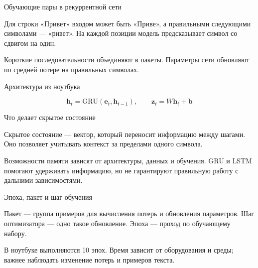 \documentclass[aspectratio=169,12pt]{beamer}
\begin{document}
\begin{frame}{Обучающие пары в рекуррентной сети}
\color{ink}
{\small Для строки «Привет» входом может быть «Приве», а правильными следующими символами — «ривет». На каждой позиции модель предсказывает символ со сдвигом на один.
\par\vspace{0.6em}Короткие последовательности объединяют в пакеты. Параметры сети обновляют по средней потере на правильных символах.}
\end{frame}

\begin{frame}{Архитектура из ноутбука}
\color{ink}
\begin{center}\end{center}\[\mathbf h_t=\mathrm{GRU}(\mathbf e_t,\mathbf h_{t-1}),\qquad\mathbf z_t=W\mathbf h_t+\mathbf b\]
\end{frame}

\begin{frame}{Что делает скрытое состояние}
\color{ink}
{\small Скрытое состояние — вектор, который переносит информацию между шагами. Оно позволяет учитывать контекст за пределами одного символа.
\par\vspace{0.6em}Возможности памяти зависят от архитектуры, данных и обучения. GRU и LSTM помогают удерживать информацию, но не гарантируют правильную работу с дальними зависимостями.}
\end{frame}

\begin{frame}{Эпоха, пакет и шаг обучения}
\color{ink}
{\small Пакет — группа примеров для вычисления потерь и обновления параметров. Шаг оптимизатора — одно такое обновление. Эпоха — проход по обучающему набору.
\par\vspace{0.6em}В ноутбуке выполняются 10 эпох. Время зависит от оборудования и среды; важнее наблюдать изменение потерь и примеров текста.}
\end{frame}
\end{document}

